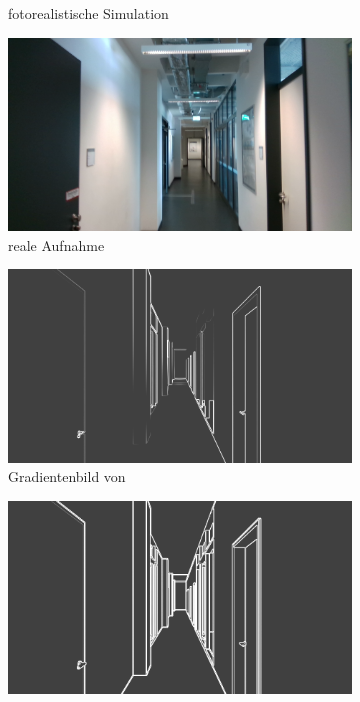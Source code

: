 \begin{figure}
\begin{subfigure}[t]{0.24\linewidth}
		\caption{fotorealistische \hspace{1cm} Simulation}
		\label{subfig:photorealistic}
	\end{subfigure}
	\hfill 
	\begin{subfigure}[t]{0.24\linewidth}
		\centering
		\includegraphics[width=\linewidth]{images/syn_dataset/r000305.png}
		\caption{reale Aufnahme \hspace{2cm}}
		\label{subfig:real}
	\end{subfigure}
	\hfill 
	\begin{subfigure}[t]{0.24\linewidth}
		\centering
		\includegraphics[width=\linewidth]{images/syn_dataset/bg00708.png}
		\caption{Gradientenbild  \hspace{1cm} von }
	\end{subfigure}
	\hfill
	\begin{subfigure}[t]{0.24\linewidth}
		\centering
		\includegraphics[width=\linewidth]{images/syn_dataset/eg00708.png}

\end{subfigure}
\end{figure}
